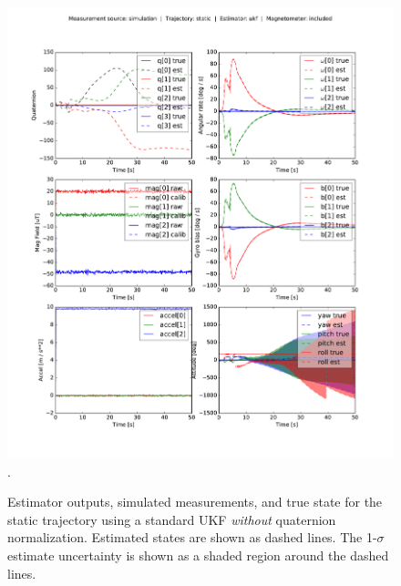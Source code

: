 \documentclass[conference]{IEEEtran}
\begin{document}
\begin{figure}[!t]
  \centering
  \includegraphics[width=7.5in]{figures/est_result_sim_static_ukf_mag.pdf}
  \DeclareGraphicsExtensions.
  \caption{Estimator outputs, simulated measurements, and true state for the static trajectory using a standard UKF \emph{without} quaternion normalization. Estimated states are shown as dashed lines. The 1-$\sigma$ estimate uncertainty is shown as a shaded region around the dashed lines.}
  \label{fig:est_result_sim_static_ukf_mag}
\end{figure}
\end{document}
